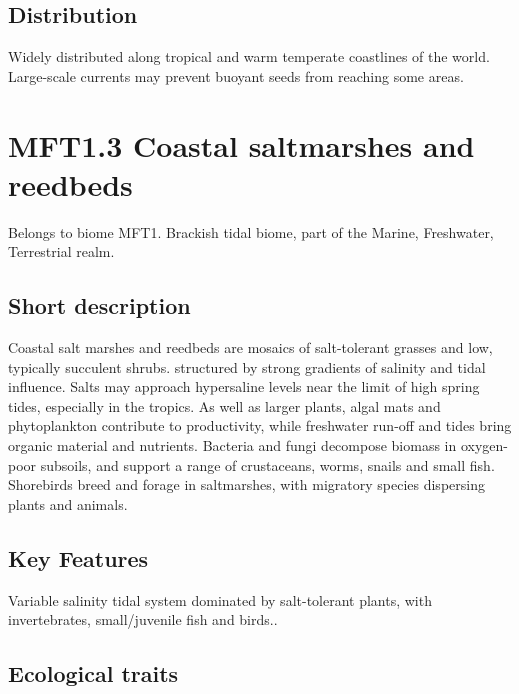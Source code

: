 \documentclass[
  letterpaper,
  DIV=11,
  numbers=noendperiod]{scrartcl}
\begin{document}
\subsection{Distribution}\label{distribution-50}

Widely distributed along tropical and warm temperate coastlines of the
world. Large-scale currents may prevent buoyant seeds from reaching some
areas.

\section{MFT1.3 Coastal saltmarshes and
reedbeds}\label{mft1.3-coastal-saltmarshes-and-reedbeds}

Belongs to biome MFT1. Brackish tidal biome, part of the Marine,
Freshwater, Terrestrial realm.

\subsection{Short description}\label{short-description-51}

Coastal salt marshes and reedbeds are mosaics of salt-tolerant grasses
and low, typically succulent shrubs. structured by strong gradients of
salinity and tidal influence. Salts may approach hypersaline levels near
the limit of high spring tides, especially in the tropics. As well as
larger plants, algal mats and phytoplankton contribute to productivity,
while freshwater run-off and tides bring organic material and nutrients.
Bacteria and fungi decompose biomass in oxygen-poor subsoils, and
support a range of crustaceans, worms, snails and small fish. Shorebirds
breed and forage in saltmarshes, with migratory species dispersing
plants and animals.

\subsection{Key Features}\label{key-features-51}

Variable salinity tidal system dominated by salt-tolerant plants, with
invertebrates, small/juvenile fish and birds..

\subsection{Ecological traits}\label{ecological-traits-51}
\end{document}
